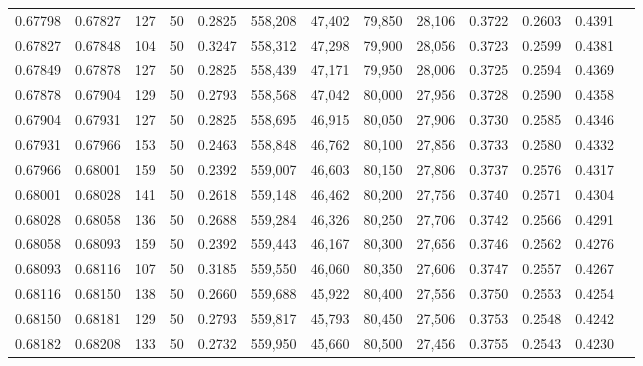 \begin{tabular}{rrrrrrrrrrrrr}
0.67798 & 0.67827 &   127 &  50 &                                     0.2825 & 558,208 &  47,402 &  79,850 &  28,106 & 0.3722 & 0.2603 & 0.4391 \\
0.67827 & 0.67848 &   104 &  50 &                                     0.3247 & 558,312 &  47,298 &  79,900 &  28,056 & 0.3723 & 0.2599 & 0.4381 \\
0.67849 & 0.67878 &   127 &  50 &                                     0.2825 & 558,439 &  47,171 &  79,950 &  28,006 & 0.3725 & 0.2594 & 0.4369 \\
0.67878 & 0.67904 &   129 &  50 &                                     0.2793 & 558,568 &  47,042 &  80,000 &  27,956 & 0.3728 & 0.2590 & 0.4358 \\
0.67904 & 0.67931 &   127 &  50 &                                     0.2825 & 558,695 &  46,915 &  80,050 &  27,906 & 0.3730 & 0.2585 & 0.4346 \\
0.67931 & 0.67966 &   153 &  50 &                                     0.2463 & 558,848 &  46,762 &  80,100 &  27,856 & 0.3733 & 0.2580 & 0.4332 \\
0.67966 & 0.68001 &   159 &  50 &                                     0.2392 & 559,007 &  46,603 &  80,150 &  27,806 & 0.3737 & 0.2576 & 0.4317 \\
0.68001 & 0.68028 &   141 &  50 &                                     0.2618 & 559,148 &  46,462 &  80,200 &  27,756 & 0.3740 & 0.2571 & 0.4304 \\
0.68028 & 0.68058 &   136 &  50 &                                     0.2688 & 559,284 &  46,326 &  80,250 &  27,706 & 0.3742 & 0.2566 & 0.4291 \\
0.68058 & 0.68093 &   159 &  50 &                                     0.2392 & 559,443 &  46,167 &  80,300 &  27,656 & 0.3746 & 0.2562 & 0.4276 \\
0.68093 & 0.68116 &   107 &  50 &                                     0.3185 & 559,550 &  46,060 &  80,350 &  27,606 & 0.3747 & 0.2557 & 0.4267 \\
0.68116 & 0.68150 &   138 &  50 &                                     0.2660 & 559,688 &  45,922 &  80,400 &  27,556 & 0.3750 & 0.2553 & 0.4254 \\
0.68150 & 0.68181 &   129 &  50 &                                     0.2793 & 559,817 &  45,793 &  80,450 &  27,506 & 0.3753 & 0.2548 & 0.4242 \\
0.68182 & 0.68208 &   133 &  50 &                                     0.2732 & 559,950 &  45,660 &  80,500 &  27,456 & 0.3755 & 0.2543 & 0.4230 \\

\end{tabular}
